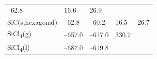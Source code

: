 \documentclass[
]{book}
\theoremstyle{definition}
\theoremstyle{definition}
\theoremstyle{definition}
\theoremstyle{remark}
\begin{document}
\begin{longtable}[]{@{}lllll@{}}
\begin{minipage}[t]{0.20\columnwidth}
--62.8\strut
\end{minipage} & \begin{minipage}[t]{0.18\columnwidth}\raggedright
16.6\strut
\end{minipage} & \begin{minipage}[t]{0.18\columnwidth}\raggedright
26.9\strut
\end{minipage}\tabularnewline
\begin{minipage}[t]{0.10\columnwidth}\raggedright
SiC(s,hexagonal)\strut
\end{minipage} & \begin{minipage}[t]{0.19\columnwidth}\raggedright
--62.8\strut
\end{minipage} & \begin{minipage}[t]{0.20\columnwidth}\raggedright
--60.2\strut
\end{minipage} & \begin{minipage}[t]{0.18\columnwidth}\raggedright
16.5\strut
\end{minipage} & \begin{minipage}[t]{0.18\columnwidth}\raggedright
26.7\strut
\end{minipage}\tabularnewline
\begin{minipage}[t]{0.10\columnwidth}\raggedright
SiCl\textsubscript{4}(g)\strut
\end{minipage} & \begin{minipage}[t]{0.19\columnwidth}\raggedright
--657.0\strut
\end{minipage} & \begin{minipage}[t]{0.20\columnwidth}\raggedright
--617.0\strut
\end{minipage} & \begin{minipage}[t]{0.18\columnwidth}\raggedright
330.7\strut
\end{minipage} & \begin{minipage}[t]{0.18\columnwidth}\raggedright
\strut
\end{minipage}\tabularnewline
\begin{minipage}[t]{0.10\columnwidth}\raggedright
SiCl\textsubscript{4}(l)\strut
\end{minipage} & \begin{minipage}[t]{0.19\columnwidth}\raggedright
--687.0\strut
\end{minipage} & \begin{minipage}[t]{0.20\columnwidth}\raggedright
--619.8\strut
\end{minipage} & \begin{minipage}[t]{0.18\columnwidth}\raggedright

\end{minipage}
\end{longtable}
\end{document}
